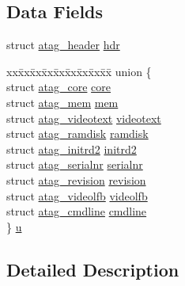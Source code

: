 \subsection*{\-Data \-Fields}
\begin{DoxyCompactItemize}
\item 
struct \hyperlink{structatag__header}{atag\-\_\-header} \hyperlink{structatag_a66c7c965cacca4dc92877044e8dfe41b}{hdr}
\item 
\begin{tabbing}
xx\=xx\=xx\=xx\=xx\=xx\=xx\=xx\=xx\=\kill
union \{\\
\>struct \hyperlink{structatag__core}{atag\_core} \hyperlink{structatag_a3e5111a292381fc207b3a8641ec6768b}{core}\\
\>struct \hyperlink{structatag__mem}{atag\_mem} \hyperlink{structatag_a0aba8dc5f020043ea2cb77d6881db48c}{mem}\\
\>struct \hyperlink{structatag__videotext}{atag\_videotext} \hyperlink{structatag_a7ad6fedc71b884606da461f8c80aed71}{videotext}\\
\>struct \hyperlink{structatag__ramdisk}{atag\_ramdisk} \hyperlink{structatag_a376ebff53c0bc342459800dcbe5143db}{ramdisk}\\
\>struct \hyperlink{structatag__initrd2}{atag\_initrd2} \hyperlink{structatag_a0b791b85cd154b77c27383a8fe75d6e9}{initrd2}\\
\>struct \hyperlink{structatag__serialnr}{atag\_serialnr} \hyperlink{structatag_ac9d79c3e0dfd42492b63d91cf99a39c2}{serialnr}\\
\>struct \hyperlink{structatag__revision}{atag\_revision} \hyperlink{structatag_ad9f0972cb9739fe2952313cfb7086209}{revision}\\
\>struct \hyperlink{structatag__videolfb}{atag\_videolfb} \hyperlink{structatag_acb9829613674a77c810583283cf73210}{videolfb}\\
\>struct \hyperlink{structatag__cmdline}{atag\_cmdline} \hyperlink{structatag_a967131921bcaf65942ba3c162ca9b216}{cmdline}\\
\} \hyperlink{structatag_aacb06f1a4723ee6a39bd41e95aecd225}{u}\\

\end{tabbing}\end{DoxyCompactItemize}


\subsection{\-Detailed \-Description}


